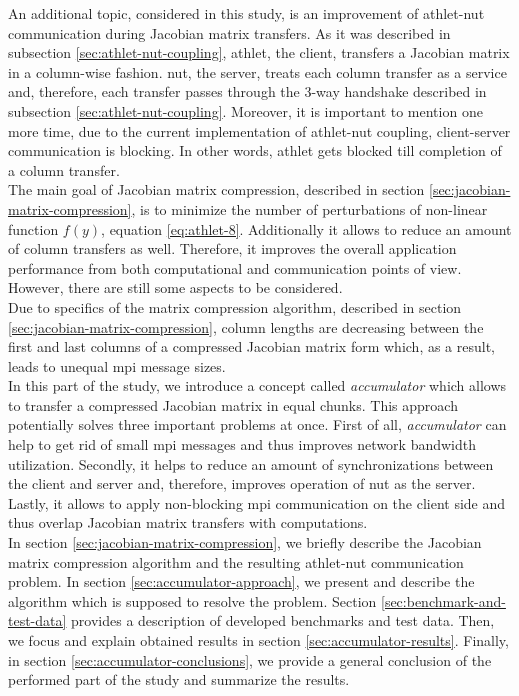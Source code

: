 An additional topic, considered in this study, is an improvement of \acrshort{athlet}-\acrshort{nut} communication during Jacobian matrix transfers. As it was described in subsection \ref{sec:athlet-nut-coupling}, \acrshort{athlet}, the client, transfers a Jacobian matrix in a column-wise fashion. \acrshort{nut}, the server, treats each column transfer as a service and, therefore, each transfer passes through the 3-way handshake described in subsection \ref{sec:athlet-nut-coupling}. Moreover, it is important to mention one more time,   due to the current implementation of \acrshort{athlet}-\acrshort{nut} coupling, client-server communication is blocking. In other words, \acrshort{athlet} gets blocked till completion of a column transfer. \\


The main goal of Jacobian matrix compression, described in section \ref{sec:jacobian-matrix-compression}, is to minimize the number of perturbations of non-linear function $f(y)$, equation \ref{eq:athlet-8}. Additionally it allows to reduce an amount of column transfers as well. Therefore, it improves the overall application performance from both computational and communication points of view. However, there are still some aspects to be considered.\\


Due to specifics of the matrix compression algorithm, described in section \ref{sec:jacobian-matrix-compression}, column lengths are decreasing between the first and last columns of a compressed Jacobian matrix form which, as a result, leads to unequal \acrshort{mpi} message sizes.\\


In this part of the study, we introduce a concept called \textit{accumulator} which allows to transfer a compressed Jacobian matrix in equal chunks. This approach potentially solves three important problems at once. First of all, \textit{accumulator} can help to get rid of small \acrshort{mpi} messages and thus improves network bandwidth utilization. Secondly, it helps to reduce an amount of synchronizations between the client and server and, therefore, improves operation of \acrshort{nut} as the server. Lastly, it allows to apply non-blocking \acrshort{mpi} communication on the client side and thus overlap Jacobian matrix transfers with computations.\\


In section \ref{sec:jacobian-matrix-compression}, we briefly describe the Jacobian matrix compression algorithm and the resulting \acrshort{athlet}-\acrshort{nut} communication problem. In section \ref{sec:accumulator-approach}, we present and describe the algorithm which is supposed to resolve the problem. Section \ref{sec:benchmark-and-test-data} provides a description of developed benchmarks and test data. Then, we focus and explain obtained results in section \ref{sec:accumulator-results}. Finally, in section \ref{sec:accumulator-conclusions}, we provide a general conclusion of the performed part of the study and summarize the results.\\
